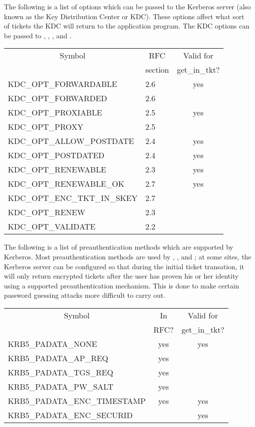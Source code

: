 The following is a list of options which can be passed to the Kerberos
server (also known as the Key Distribution Center or KDC).  These
options affect what sort of tickets the KDC will return to the
application program.  The KDC options can be passed to
, ,
, and . 


\begin{center}
\begin{tabular}{llc}
\multicolumn{1}{c}{Symbol}&\multicolumn{1}{c}{RFC}& Valid for \\
&\multicolumn{1}{c}{section}&get_in_tkt? \\ \hline
KDC_OPT_FORWARDABLE	& 2.6	& yes		\\
KDC_OPT_FORWARDED	& 2.6	&		\\
KDC_OPT_PROXIABLE	& 2.5	& yes		\\
KDC_OPT_PROXY		& 2.5	&		\\
KDC_OPT_ALLOW_POSTDATE	& 2.4	& yes		\\
KDC_OPT_POSTDATED	& 2.4	& yes		\\
KDC_OPT_RENEWABLE	& 2.3	& yes		\\
KDC_OPT_RENEWABLE_OK	& 2.7	& yes		\\
KDC_OPT_ENC_TKT_IN_SKEY	& 2.7	&		\\
KDC_OPT_RENEW		& 2.3	&		\\
KDC_OPT_VALIDATE	& 2.2	&		\\
\end{tabular}
\end{center}
\label{KDCOptions}

The following is a list of preauthentication methods which are supported
by Kerberos.  Most preauthentication methods are used by
, , and
; at some sites, the Kerberos server can be
configured so that during the initial ticket transation, it will only
return encrypted tickets after the user has proven his or her identity
using a supported preauthentication mechanism.  This is done to make
certain password guessing attacks more difficult to carry out.



\begin{center}
\begin{tabular}{lcc}
\multicolumn{1}{c}{Symbol}&In & Valid for \\
&RFC?&get_in_tkt? \\ \hline
KRB5_PADATA_NONE		& yes	& yes	\\
KRB5_PADATA_AP_REQ		& yes	&	\\
KRB5_PADATA_TGS_REQ		& yes	&	\\
KRB5_PADATA_PW_SALT		& yes	&	\\
KRB5_PADATA_ENC_TIMESTAMP	& yes	& yes	\\
KRB5_PADATA_ENC_SECURID		&	& yes	\\
\end{tabular}
\end{center}
\label{padata-types}

